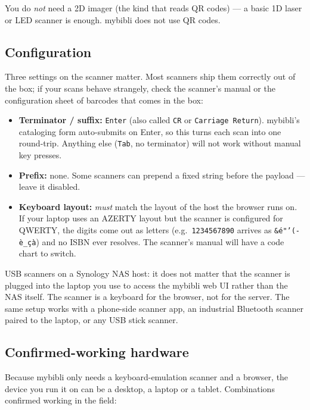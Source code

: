 You do \emph{not} need a 2D imager (the kind that reads QR codes) —
a basic 1D laser or LED scanner is enough. mybibli does not use QR
codes.

\subsection*{Configuration}

Three settings on the scanner matter. Most scanners ship them
correctly out of the box; if your scans behave strangely, check the
scanner's manual or the configuration sheet of barcodes that comes
in the box:

\begin{itemize}
  \item \textbf{Terminator / suffix:} \texttt{Enter} (also called
        \texttt{CR} or \texttt{Carriage Return}). mybibli's
        cataloging form auto-submits on Enter, so this turns each
        scan into one round-trip. Anything else (\texttt{Tab}, no
        terminator) will not work without manual key presses.
  \item \textbf{Prefix:} none. Some scanners can prepend a fixed
        string before the payload — leave it disabled.
  \item \textbf{Keyboard layout:} \emph{must} match the layout of
        the host the browser runs on. If your laptop uses an AZERTY
        layout but the scanner is configured for QWERTY, the digits
        come out as letters (e.g.\ \texttt{1234567890} arrives as
        \texttt{\&é"'(-è\_çà}) and no ISBN ever resolves. The
        scanner's manual will have a code chart to switch.
\end{itemize}

\begin{tip}
USB scanners on a Synology NAS host: it does not matter that the
scanner is plugged into the laptop you use to access the mybibli
web UI rather than the NAS itself. The scanner is a keyboard for
the browser, not for the server. The same setup works with a
phone-side scanner app, an industrial Bluetooth scanner paired to
the laptop, or any USB stick scanner.
\end{tip}

\subsection*{Confirmed-working hardware}

Because mybibli only needs a keyboard-emulation scanner and a
browser, the device you run it on can be a desktop, a laptop or a
tablet. Combinations confirmed working in the field:

